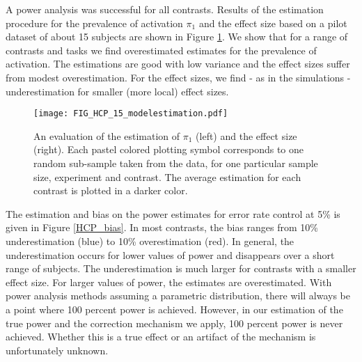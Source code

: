 A power analysis was successful for all contrasts.  Results of the estimation procedure for the prevalence of activation $\pi_1$ and the effect size based on a pilot dataset of about 15 subjects are shown in Figure \ref{HCP_pi1}.  We show that for a range of contrasts and tasks we find overestimated estimates for the prevalence of activation.  The estimations are good with low variance and the effect sizes suffer from modest overestimation.  For the effect sizes, we find - as in the simulations - underestimation for smaller (more local) effect sizes.

\begin{center}
\begin{figure}[h]
\texttt{[image: FIG\_HCP\_15\_modelestimation.pdf]}
\caption{An evaluation of the estimation of $\pi_1$ (left) and the effect size (right).  Each pastel colored plotting symbol corresponds to one random sub-sample taken from the data, for one particular sample size, experiment and contrast.  The average estimation for each contrast is plotted in a darker color. \label{HCP_pi1}}
\end{figure}
\end{center}

The estimation and bias on the power estimates for error rate control at 5\% is given in Figure \ref{HCP_bias}.  In most contrasts, the bias ranges from 10\% underestimation (blue) to 10\% overestimation (red).  In general, the underestimation occurs for lower values of power and disappears over a short range of subjects.  The underestimation is much larger for contrasts with a smaller effect size.
For larger values of power, the estimates are overestimated.  With power analysis methods assuming a parametric distribution, there will always be a point where 100 percent power is achieved.  However, in our estimation of the true power and the correction mechanism we apply, 100 percent power is never achieved.  Whether this is a true effect or an artifact of the mechanism is unfortunately unknown.


